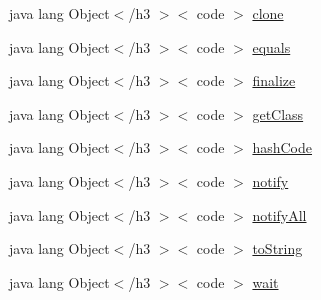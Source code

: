 \begin{DoxyCompactItemize}
\item 
java lang Object$<$/h3 $>$$<$ code $>$ \hyperlink{_stations_list_adapter_8html_adc9607fcabf6f2d7f401ad52015ef6e0}{clone}
\item 
java lang Object$<$/h3 $>$$<$ code $>$ \hyperlink{_stations_list_adapter_8html_a8974318cea585f72df717e0380ec7104}{equals}
\item 
java lang Object$<$/h3 $>$$<$ code $>$ \hyperlink{_stations_list_adapter_8html_ab2315181ead4aeedef2374039b6ddde7}{finalize}
\item 
java lang Object$<$/h3 $>$$<$ code $>$ \hyperlink{_stations_list_adapter_8html_a98e6644727fe65eac217a6855045be43}{get\-Class}
\item 
java lang Object$<$/h3 $>$$<$ code $>$ \hyperlink{_stations_list_adapter_8html_a8e178e2bb2bef055ea23ea3910a221ca}{hash\-Code}
\item 
java lang Object$<$/h3 $>$$<$ code $>$ \hyperlink{_stations_list_adapter_8html_ae99ae10b5010594dbda4794e02db271b}{notify}
\item 
java lang Object$<$/h3 $>$$<$ code $>$ \hyperlink{_stations_list_adapter_8html_a1279357e6e09e33e75b55eb05fdb6436}{notify\-All}
\item 
java lang Object$<$/h3 $>$$<$ code $>$ \hyperlink{_stations_list_adapter_8html_a36e8a76a4132c9a7081416f27d087615}{to\-String}
\item 
java lang Object$<$/h3 $>$$<$ code $>$ \hyperlink{_stations_list_adapter_8html_a9a9f0c22e5688d478c707f910f1c1aea}{wait}
\end{DoxyCompactItemize}


